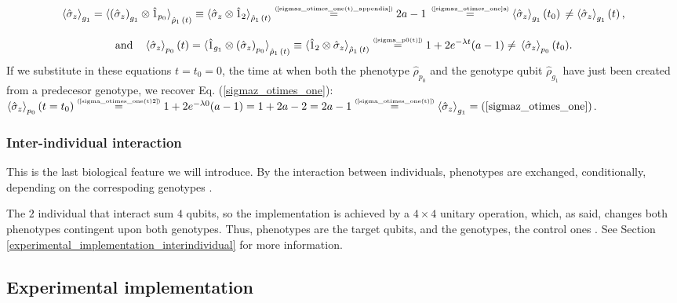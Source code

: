\documentclass[11pt]{article}
\numberwithin{equation}{section} %
\numberwithin{figure}{section} %
\newcommand\numeq[1] %
  {\stackrel{\scriptscriptstyle(\mkern-1.5mu#1\mkern-1.5mu)}{=}}
\begin{document}
\begin{equation} \label{sigma_otimes_one(t)}
 \braket{\hat{\sigma}_z}_{g_1}= \braket{ \left(\hat{\sigma}_z\right)_{g_1}\otimes \hat{1}_{p_0}}_{\hat{\rho}_1\,(t)} \equiv\braket{\hat{\sigma}_z\otimes\hat{1}_2}_{{\hat{\rho}_1\,(t)}}
 \numeq{\textrm{\ref{sigmaz_otimes_one(t)_appendix}}}2a-1\,\numeq{\textrm{\ref{sigmaz_otimes_one}a}}\braket{\hat{\sigma}_z}_{g_1}(t_0)\,\neq\braket{\hat{\sigma}_z}_{g_1}(t)\,\textrm{,}
\end{equation} 

\begin{equation} \label{sigma_otimes_one(t)2}
 \textrm{and}\quad\braket{\hat{\sigma}_z}_{p_0}(t)= \braket{\hat{1}_{g_1}\otimes\left(\hat{\sigma}_z\right)_{p_0}}_{\hat{\rho}_1\,(t)}\equiv\braket{\hat{1}_2\otimes\hat{\sigma}_z}_{\hat{\rho}_1\,(t)}
 \numeq{\textrm{\ref{sigma_p0(t)}}} 1+2e^{-\lambda t}(a-1)\neq\,\braket{\hat{\sigma}_z}_{p_0}(t_0)\textrm{.}
\end{equation}
If we substitute in these equations $t=t_0=0$, the time at when both the phenotype $\hat{\rho}_{p_0}$ and the genotype qubit $\hat{\rho}_{g_1}$ have just been created from a predecesor genotype, we recover Eq. (\ref{sigmaz_otimes_one}):  $\braket{\hat{\sigma}_z}_{p_0}(t=t_0)\numeq{\textrm{\ref{sigma_otimes_one(t)2}}} 1+2e^{-\lambda 0}(a-1)=1+2a-2=2a-1\numeq{\textrm{\ref{sigma_otimes_one(t)}}}\braket{\hat{\sigma}_z}_{g_1}=(\ref{sigmaz_otimes_one})$.


\subsubsection{Inter-individual interaction} \label{inter-individual}

This is the last biological feature we will introduce. By the interaction between individuals, phenotypes are exchanged, conditionally, depending on the correspoding genotypes \cite[p.~2, l.~28-29]{QAL_IBM}. 

The $2$ individual that interact sum $4$ qubits, so the implementation is achieved by a $4\times 4$ unitary operation, which, as said, changes both phenotypes contingent upon both genotypes. Thus, phenotypes are the target qubits, and the genotypes, the control ones \cite[p.~2, l.~29-30]{QAL_IBM}. See Section \ref{experimental_implementation_interindividual} for more information.

\subsection{Experimental implementation} \label{experimental_implementation}
\end{document}

